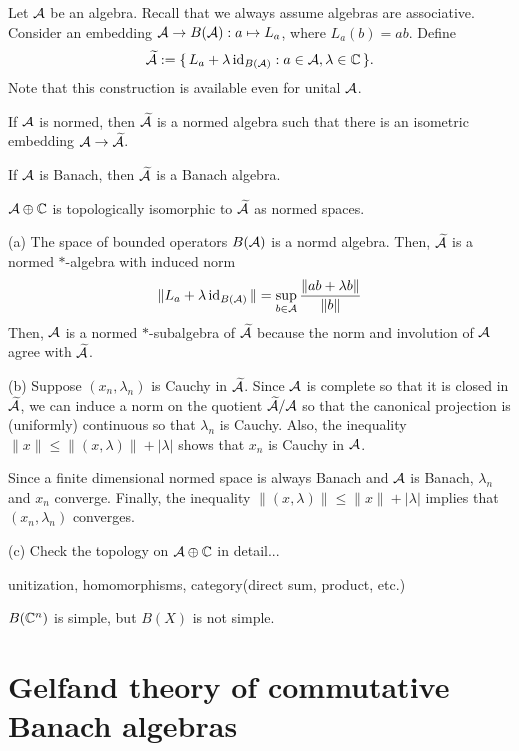 \documentclass{../note}
\begin{document}
\begin{prb}[Unitization]
Let $\mathcal{A}$ be an algebra.
Recall that we always assume algebras are associative.
Consider an embedding $\mathcal{A}\to B(\mathcal{A}):a\mapsto L_a$, where $L_a(b)=ab$.
Define
\[\widetilde{\mathcal{A}}:=\{\,L_a+\lambda\operatorname{id}_{B(\mathcal{A})}:a\in\mathcal{A},\lambda\in\mathbb{C}\,\}.\]
Note that this construction is available even for unital $\mathcal{A}$.
\begin{parts}
\item If $\mathcal{A}$ is normed, then $\widetilde{\mathcal{A}}$ is a normed algebra such that there is an isometric embedding $\mathcal{A}\to\widetilde{\mathcal{A}}$.
\item If $\mathcal{A}$ is Banach, then $\widetilde{\mathcal{A}}$ is a Banach algebra.
\item $\mathcal{A}\oplus\mathbb{C}$ is topologically isomorphic to $\widetilde{\mathcal{A}}$ as normed spaces.
\end{parts}
\end{prb}
\begin{pf}
(a)
The space of bounded operators $B(\mathcal{A})$ is a normd algebra.
Then, $\widetilde{\mathcal{A}}$ is a normed $*$-algebra with induced norm
\[\|L_a+\lambda\operatorname{id}_{B(\mathcal{A})}\|=\sup_{b\in\mathcal{A}}\frac{\|ab+\lambda b\|}{\|b\|}\]
Then, $\mathcal{A}$ is a normed $*$-subalgebra of $\widetilde{\mathcal{A}}$ because the norm and involution of $\mathcal{A}$ agree with $\widetilde{\mathcal{A}}$.

(b)
Suppose $(x_n,\lambda_n)$ is Cauchy in $\widetilde{\mathcal{A}}$.
Since $\mathcal{A}$ is complete so that it is closed in $\widetilde{\mathcal{A}}$, we can induce a norm on the quotient $\widetilde{\mathcal{A}}/\mathcal{A}$ so that the canonical projection is (uniformly) continuous so that $\lambda_n$ is Cauchy.
Also, the inequality $\|x\|\le\|(x,\lambda)\|+|\lambda|$ shows that $x_n$ is Cauchy in $\mathcal{A}$.

Since a finite dimensional normed space is always Banach and $\mathcal{A}$ is Banach, $\lambda_n$ and $x_n$ converge.
Finally, the inequality $\|(x,\lambda)\|\le\|x\|+|\lambda|$ implies that $(x_n,\lambda_n)$ converges.

(c)
Check the topology on $\mathcal{A}\oplus\mathbb{C}$ in detail...
\end{pf}



unitization, homomorphisms, category(direct sum, product, etc.)

$B(\mathbb{C}^n)$ is simple, but $B(X)$ is not simple.




\section{Gelfand theory of commutative Banach algebras}
\end{document}
